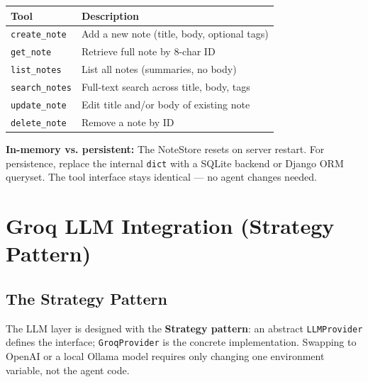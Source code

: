 \documentclass[11pt,a4paper]{article}
\begin{document}
\begin{center}
\begin{tabularx}{\linewidth}{lX}
\toprule
\textbf{Tool} & \textbf{Description} \\
\midrule
\texttt{create\_note}  & Add a new note (title, body, optional tags) \\
\texttt{get\_note}     & Retrieve full note by 8-char ID \\
\texttt{list\_notes}   & List all notes (summaries, no body) \\
\texttt{search\_notes} & Full-text search across title, body, tags \\
\texttt{update\_note}  & Edit title and/or body of existing note \\
\texttt{delete\_note}  & Remove a note by ID \\
\bottomrule
\end{tabularx}
\end{center}

\begin{infobox}
\textbf{In-memory vs. persistent:} The NoteStore resets on server restart.
For persistence, replace the internal \texttt{dict} with a SQLite backend
or Django ORM queryset. The tool interface stays identical — no agent changes needed.
\end{infobox}

\newpage
\section{Groq LLM Integration (Strategy Pattern)}

\subsection{The Strategy Pattern}

The LLM layer is designed with the \textbf{Strategy pattern}: an abstract
\texttt{LLMProvider} defines the interface; \texttt{GroqProvider} is the
concrete implementation. Swapping to OpenAI or a local Ollama model requires
only changing one environment variable, not the agent code.
\end{document}
